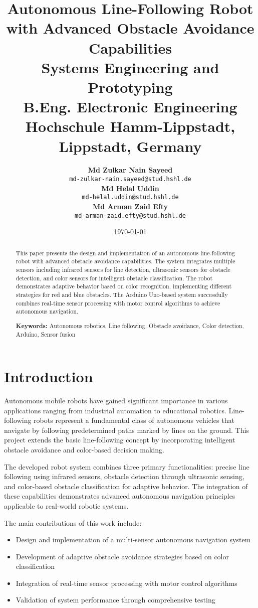 \documentclass[12pt,a4paper]{article}
\title{
    \vspace{-2cm}
    \LARGE\textbf{Autonomous Line-Following Robot with Advanced Obstacle Avoidance Capabilities}\\
    \vspace{0.5cm}
    \Large Systems Engineering and Prototyping\\
    \large B.Eng. Electronic Engineering\\
    \vspace{0.3cm}
    \normalsize Hochschule Hamm-Lippstadt, Lippstadt, Germany
}
\author{
    \begin{tabular}{c}
        \textbf{Md Zulkar Nain Sayeed}\\
        \small\texttt{md-zulkar-nain.sayeed@stud.hshl.de}\\[0.3cm]
        \textbf{Md Helal Uddin}\\
        \small\texttt{md-helal.uddin@stud.hshl.de}\\[0.3cm]
        \textbf{Md Arman Zaid Efty}\\
        \small\texttt{md-arman-zaid.efty@stud.hshl.de}
    \end{tabular}
}
\date{\today}
\begin{document}
\maketitle
\thispagestyle{empty}

\vspace{1cm}

\begin{abstract}
\noindent This paper presents the design and implementation of an autonomous line-following robot with advanced obstacle avoidance capabilities. The system integrates multiple sensors including infrared sensors for line detection, ultrasonic sensors for obstacle detection, and color sensors for intelligent obstacle classification. The robot demonstrates adaptive behavior based on color recognition, implementing different strategies for red and blue obstacles. The Arduino Uno-based system successfully combines real-time sensor processing with motor control algorithms to achieve autonomous navigation.

\vspace{0.5cm}
\noindent\textbf{Keywords:} Autonomous robotics, Line following, Obstacle avoidance, Color detection, Arduino, Sensor fusion
\end{abstract}

\newpage
\tableofcontents
\newpage

\section{Introduction}

Autonomous mobile robots have gained significant importance in various applications ranging from industrial automation to educational robotics. Line-following robots represent a fundamental class of autonomous vehicles that navigate by following predetermined paths marked by lines on the ground. This project extends the basic line-following concept by incorporating intelligent obstacle avoidance and color-based decision making.

The developed robot system combines three primary functionalities: precise line following using infrared sensors, obstacle detection through ultrasonic sensing, and color-based obstacle classification for adaptive behavior. The integration of these capabilities demonstrates advanced autonomous navigation principles applicable to real-world robotic systems.

The main contributions of this work include:
\begin{itemize}
    \item Design and implementation of a multi-sensor autonomous navigation system
    \item Development of adaptive obstacle avoidance strategies based on color classification
    \item Integration of real-time sensor processing with motor control algorithms
    \item Validation of system performance through comprehensive testing
\end{itemize}
\end{document}
